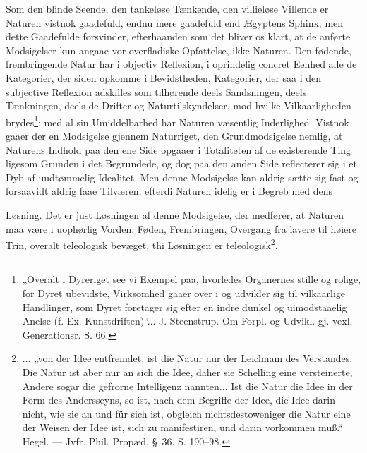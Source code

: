 \documentclass[12pt,a4paper]{book}
\begin{document}
Som den blinde Seende, den tankeløse Tænkende, den villieløse Villende er
Naturen vistnok gaadefuld, endnu mere gaadefuld end Ægyptens Sphinx; men dette
Gaadefulde forsvinder, efterhaanden som det bliver os klart, at de anførte
Modsigelser kun angaae vor overfladiske Opfattelse, ikke Naturen. Den fødende,
frembringende Natur har i objectiv Reflexion, i oprindelig concret Eenhed alle
de Kategorier, der siden opkomme i Bevidstheden, Kategorier, der saa i den
subjective Reflexion adskilles som tilhørende deels Sandsningen, deels
Tænkningen, deels de Drifter og Naturtilskyndelser, mod hvilke Vilkaarligheden
brydes\footnote{„Overalt i Dyreriget see vi Exempel paa, hvorledes Organernes
stille og rolige, for Dyret ubevidste, Virksomhed gaaer over i og udvikler sig
til vilkaarlige Handlinger, som Dyret foretager sig efter en indre dunkel og
uimodstaaelig Anelse (f. Ex. Kunstdriften)“... J. Steenstrup. Om Forpl. og
Udvikl. gj. vexl. Generationsr. S. 66.}; med al sin Umiddelbarhed har Naturen
væsentlig Inderlighed. Vistnok gaaer der en Modsigelse gjennem Naturriget, den
Grundmodsigelse nemlig, at Naturens Indhold paa den ene Side opgaaer i
Totaliteten af de existerende Ting ligesom Grunden i det Begrundede, og dog paa
den anden Side reflecterer sig i et Dyb af uudtømmelig Idealitet. Men denne
Modsigelse kan aldrig sætte sig fast og forsaavidt aldrig faae Tilværen,
efterdi Naturen idelig er i Begreb med dens

\setcounter{footnote}{1}
Løsning. Det er just Løsningen af denne Modsigelse, der medfører, at Naturen
maa være i uophørlig Vorden, Føden, Frembringen, Overgang fra lavere til høiere
Trin, overalt teleologisk bevæget, thi Løsningen er teleologisk\footnote{...
„von der Idee entfremdet, ist die Natur nur der Leichnam des Verstandes. Die
Natur ist aber nur an sich die Idee, daher sie Schelling eine versteinerte,
Andere sogar die gefrorne Intelligenz nannten... Ist die Natur die Idee in der
Form des Andersseyns, so ist, nach dem Begriffe der Idee, die Idee darin nicht,
wie sie an und für sich ist, obgleich nichtsdestoweniger die Natur eine der
Weisen der Idee ist, sich zu manifestiren, und darin vorkommen muß.“ Hegel. ---
Jvfr. Phil. Propæd. §~36. S. 190--98.}.
\end{document}
